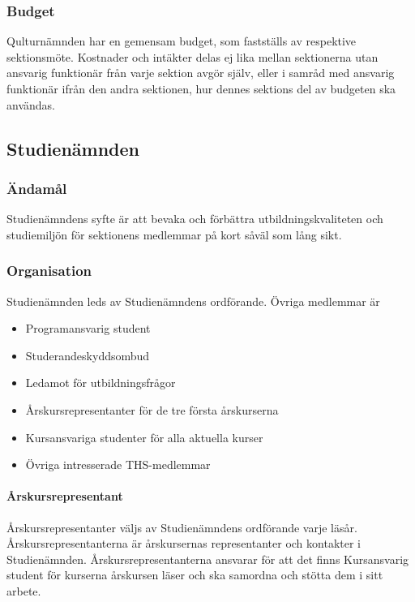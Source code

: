 \documentclass{dgovdoc}
\begin{document}
\subsubsection{Budget}
Qulturnämnden har en gemensam budget, som fastställs av respektive sektionsmöte. Kostnader och intäkter delas ej lika mellan sektionerna utan ansvarig funktionär från varje sektion avgör själv, eller i samråd med ansvarig funktionär ifrån den andra sektionen, hur dennes sektions del av budgeten ska användas.

\subsection{Studienämnden}

\subsubsection{Ändamål}

Studienämndens syfte är att bevaka och förbättra utbildningskvaliteten och
studiemiljön för sektionens medlemmar på kort såväl som lång sikt.

\subsubsection{Organisation}

Studienämnden leds av Studienämndens ordförande. Övriga medlemmar är
\begin{itemize}
	\item Programansvarig student
	\item Studerandeskyddsombud
	\item Ledamot för utbildningsfrågor
	\item Årskursrepresentanter för de tre första årskurserna
	\item Kursansvariga studenter för alla aktuella kurser
	\item Övriga intresserade THS-medlemmar
\end{itemize}

\paragraph{Årskursrepresentant}

Årskursrepresentanter väljs av Studienämndens ordförande varje läsår. Årskursrepresentanterna
är årskursernas representanter och kontakter i Studienämnden. Årskursrepresentanterna
ansvarar för att det finns Kursansvarig student för kurserna årskursen
läser och ska samordna och stötta dem i sitt arbete.
\end{document}
